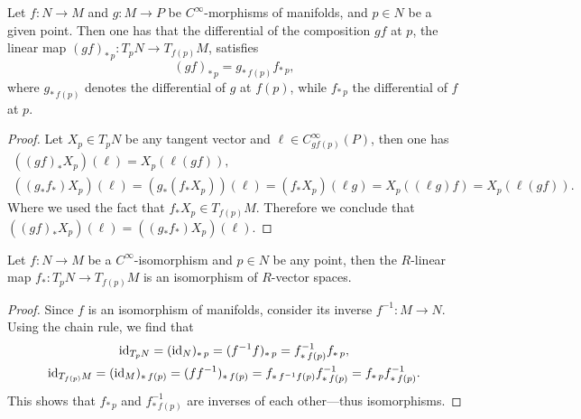 \begin{proposition}
    \label{prop:chain-rule}
    Let \(f: N \to M\) and \(g: M \to P\) be \(C^{\infty}\)-morphisms of manifolds,
    and \(p \in N\) be a given point. Then one has that the differential of the
    composition \(g f\) at \(p\), the linear map
    \((g f)_{*\, p}: T_pN \to T_{f(p)}M\), satisfies
    \[
        (g f)_{*\, p} = g_{*\, f(p)} f_{*\, p} ,
    \]
    where \(g_{*\, f(p)}\) denotes the differential of \(g\) at \(f(p)\), while
    \(f_{*\, p}\) the differential of \(f\) at \(p\).
\end{proposition}

\begin{proof}
    Let \(X_p \in T_p N\) be any tangent vector and
    \(\ell \in C_{g f(p)}^{\infty}(P)\), then one has
    \begin{gather*}
        ((g f)_{*} X_p)(\ell) = X_p(\ell (g f)),
        \\
        ((g_{*} f_{*})X_p)(\ell)
        = (g_{*}(f_{*} X_p))(\ell)
        = (f_* X_p)(\ell g)
        = X_p ((\ell g) f)
        = X_p (\ell (g f)).
    \end{gather*}
    Where we used the fact that \(f_{*} X_p \in T_{f(p)} M\). Therefore we conclude
    that \(((g f)_{*} X_p)(\ell) = ((g_{*} f_{*}) X_p)(\ell)\).
\end{proof}

\begin{corollary}
    \label{cor:iso-of-mfld-to-iso-of-vect-spaces}
    Let \(f: N \to M\) be a \(C^{\infty}\)-isomorphism and \(p \in N\) be any
    point, then the \(R\)-linear map \(f_{*}: T_p N \to T_{f(p)} M\) is an
    isomorphism of \(R\)-vector spaces.
\end{corollary}

\begin{proof}
    Since \(f\) is an isomorphism of manifolds, consider its inverse \(f^{-1}: M \to
    N\). Using the chain rule, we find that
    \begin{gather*}
        \operatorname{id}_{T_p N} = (\operatorname{id}_N)_{*\, p} = (f^{-1} f)_{*\, p} = f^{-1}_{*\, f(p)} f_{*\, p},
        \\
        \operatorname{id}_{T_{f(p)} M}
        = (\operatorname{id}_M)_{*\, f(p)}
        = (f f^{-1})_{*\, f(p)}
        = f_{*\, f^{-1} f(p)} f^{-1}_{*\, f(p)}
        = f_{*\, p} f^{-1}_{*\, f(p)}.
    \end{gather*}
    This shows that \(f_{*\, p}\) and \(f^{-1}_{*\, f(p)}\) are inverses of each
    other---thus isomorphisms.
\end{proof}

